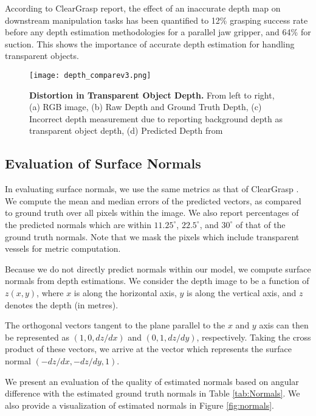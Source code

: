 According to ClearGrasp report, the effect of an inaccurate depth map on downstream manipulation tasks has been quantified to 12\% grasping success rate before any depth estimation methodologies for a parallel jaw gripper, and 64\% for suction. This shows the importance of accurate depth estimation for handling transparent objects. 
 
\begin{figure}[t]
\centering
\texttt{[image: depth\_comparev3.png]} \\
\caption{\textbf{Distortion in Transparent Object Depth.} From left to right, (a) RGB image, (b) Raw Depth and Ground Truth Depth, (c) Incorrect depth measurement due to reporting background depth as transparent object depth, (d) Predicted Depth from \algoName}
\label{fig:transparent_error}
\end{figure}

\subsection{Evaluation of Surface Normals}
In evaluating surface normals, we use the same metrics as that of ClearGrasp \citep{ClearGrasp}. We compute the mean and median errors of the predicted vectors, as compared to ground truth over all pixels within the image. We also report percentages of the predicted normals which are within $11.25^{\circ}$, $22.5^{\circ}$, and $30^{\circ}$ of that of the ground truth normals. Note that we mask the pixels which include transparent vessels for metric computation.

Because we do not directly predict normals within our model, we compute surface normals from depth estimations. We consider the depth image to be a function of $z(x,y)$, where $x$ is along the horizontal axis, $y$ is along the vertical axis, and $z$ denotes the depth (in metres).

The orthogonal vectors tangent to the plane parallel to the $x$ and $y$ axis can then be represented as $(1, 0, dz/dx)$ and $(0,1,dz/dy)$, respectively. Taking the cross product of these vectors, we arrive at the vector which represents the surface normal $(-dz/dx, -dz/dy, 1)$.

We present an evaluation of the quality of estimated normals based on angular difference with the estimated ground truth normals in Table \ref{tab:Normals}. We also provide a visualization of estimated normals in Figure \ref{fig:normals}.
    
